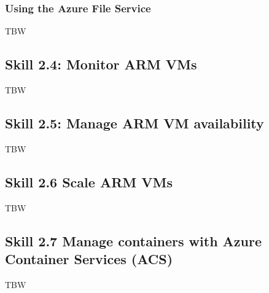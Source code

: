 \documentclass[12pt]{article}
\begin{document}
\subsubsection{Using the Azure File Service}
TBW

\subsection{Skill 2.4: Monitor ARM VMs}
TBW

\subsection{Skill 2.5: Manage ARM VM availability}
TBW

\subsection{Skill 2.6 Scale ARM VMs}
TBW

\subsection{Skill 2.7 Manage containers with Azure Container Services (ACS)}
TBW
\end{document}
